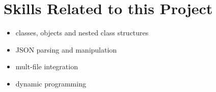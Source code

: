 
\section{Skills Related to this Project}

\begin{itemize}
  \item classes, objects and nested class structures 
  \item JSON parsing and manipulation 
  \item mult-file integration
  \item dynamic programming 
\end{itemize}